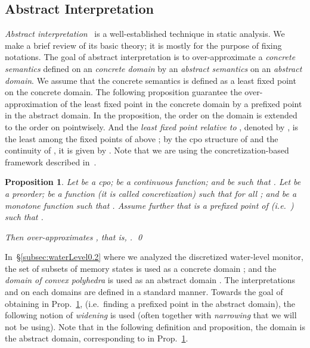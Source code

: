\documentclass[envcountsect,orivec]{llncs} \pdfoutput=1
\newtheorem{myprop}[mythm]{Proposition}
\theoremstyle{definition}
\def\myqed{\qed}
\begin{document}
\subsection{Abstract Interpretation}\label{subsec:abstinterp}
\emph{Abstract interpretation}~\cite{Cousot1978} is a well-established
technique in static analysis.  We make a brief review of its basic
theory; it is
mostly for the purpose of fixing notations.
The goal of abstract interpretation is to over-approximate a \emph{concrete semantics} defined on an \emph{concrete domain} by an \emph{abstract semantics} on an \emph{abstract domain}.
We assume that the concrete semantics is defined as a least fixed point on the concrete domain.
The following proposition guarantee the over-approximation of the least fixed point in the concrete domain by a prefixed point in the abstract domain.
In the proposition, the order  on the domain  is extended to the order on  pointwisely.
And the \emph{least fixed point relative to }, denoted by , is the  
 least among the fixed points of  above ; by the cpo
 structure of  and the continuity of , it is given by . 
Note that we are using the concretization-based framework described in~\cite{Cousot1992a}.


\begin{myprop}\label{prop:concretization}
Let  be a cpo;
  be a continuous function;
 and  be such that .
Let  be a preorder;
  be a function (it is called \emph{concretization}) such that 
 for all ; and
  be a monotone function such that .
Assume further that   is a prefixed point of   
 (i.e.\ )
 such that .


Then  over-approximates , that is,
.
\myqed
\end{myprop}































In~\S{}\ref{subsec:waterLevel0.2} where we analyzed the discretized water-level monitor, the set  of subsets of memory states is used as a concrete domain ; and the \emph{domain of convex polyhedra} is used as an abstract domain . The interpretations  and  on each domains are defined in a standard manner.
Towards the goal of obtaining  in Prop.~\ref{prop:concretization}, (i.e.\ finding a prefixed point in the abstract domain), the following notion of
\emph{widening} is used (often together with \emph{narrowing} that we will not
be using).
Note that in the following definition and proposition, the domain  is the abstract domain, corresponding to  in Prop.~\ref{prop:concretization}.
\end{document}
